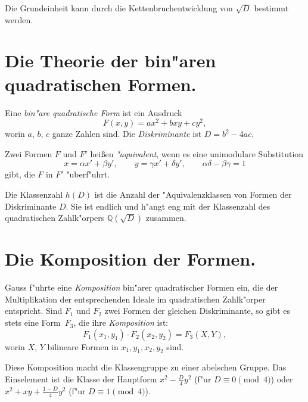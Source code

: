 \documentclass[12pt,a4paper]{article}
\theoremstyle{definition}
\begin{document}
Die Grundeinheit kann durch die Kettenbruchentwicklung von $\sqrt{D}$ bestimmt werden.

\newpage

\section{Die Theorie der bin"aren quadratischen Formen.}

Eine \emph{bin"are quadratische Form} ist ein Ausdruck
\begin{equation}\tag{1}
F(x,y) = ax^2 + bxy + cy^2,
\end{equation}
worin $a$, $b$, $c$ ganze Zahlen sind. Die \emph{Diskriminante} ist $D = b^2 - 4ac$.

Zwei Formen $F$ und $F'$ hei\ss{}en \emph{"aquivalent}, wenn es eine unimodulare Substitution
\begin{equation}\tag{2}
x = \alpha x' + \beta y',\qquad y = \gamma x' + \delta y',\qquad \alpha\delta - \beta\gamma = 1
\end{equation}
gibt, die $F$ in $F'$ "uberf"uhrt.

Die Klassenzahl $h(D)$ ist die Anzahl der "Aquivalenzklassen von Formen der Diskriminante $D$. Sie ist endlich und h"angt eng mit der Klassenzahl des quadratischen Zahlk"orpers $\mathbb{Q}(\sqrt{D})$ zusammen.

\newpage

\section{Die Komposition der Formen.}

Gauss f"uhrte eine \emph{Komposition} bin"arer quadratischer Formen ein, die der Multiplikation der entsprechenden Ideale im quadratischen Zahlk"orper entspricht. Sind $F_1$ und $F_2$ zwei Formen der gleichen Diskriminante, so gibt es stets eine Form~$F_3$, die ihre \emph{Komposition} ist:
\begin{equation}\tag{1}
F_1(x_1,y_1) \cdot F_2(x_2,y_2) = F_3(X,Y),
\end{equation}
worin $X$, $Y$ bilineare Formen in $x_1,y_1,x_2,y_2$ sind.

Diese Komposition macht die Klassengruppe zu einer abelschen Gruppe. Das Einselement ist die Klasse der Hauptform $x^2 - \frac{D}{4}y^2$ (f"ur $D \equiv 0 \pmod{4}$) oder $x^2 + xy + \frac{1-D}{4}y^2$ (f"ur $D \equiv 1 \pmod{4}$).

\newpage
\end{document}
